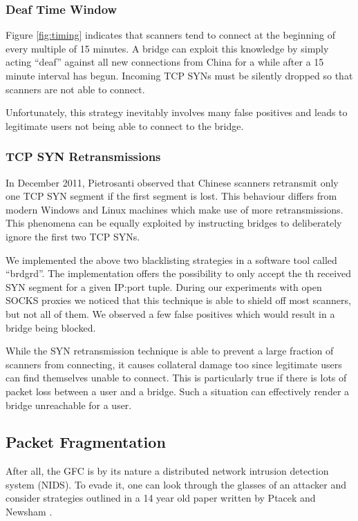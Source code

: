 \documentclass[runningheads,a4paper]{llncs}
\begin{document}
\subsubsection{Deaf Time Window}
Figure \ref{fig:timing} indicates that scanners tend to connect at the beginning of every multiple
of 15 minutes. A bridge can exploit this knowledge by simply acting ``deaf'' against all new
connections from China for a while after a 15 minute interval has begun. Incoming TCP SYNs must be
silently dropped so that scanners are not able to connect.

Unfortunately, this strategy inevitably involves many false positives and leads to legitimate users
not being able to connect to the bridge.

\subsubsection{TCP SYN Retransmissions}
In December 2011, Pietrosanti \cite{fabio} observed that Chinese scanners retransmit only one TCP
SYN segment if the first segment is lost. This behaviour differs from modern Windows and Linux
machines which make use of more retransmissions. This phenomena can be equally exploited by
instructing bridges to deliberately ignore the first two TCP SYNs.

We implemented the above two blacklisting strategies in a software tool called ``brdgrd''. The
implementation offers the possibility to only accept the th received SYN segment for a given
IP:port tuple. During our experiments with open SOCKS proxies we noticed that this technique is able
to shield off most scanners, but not all of them. We observed a few false positives which would
result in a bridge being blocked.

While the SYN retransmission technique is able to prevent a large fraction of scanners from
connecting, it causes collateral damage too since legitimate users can find themselves unable to
connect. This is particularly true if there is lots of packet loss between a user and a bridge.
Such a situation can effectively render a bridge unreachable for a user.

\subsection{Packet Fragmentation}
After all, the GFC is by its nature a distributed network intrusion detection system (NIDS). To
evade it, one can look through the glasses of an attacker and consider strategies outlined in a 14
year old paper written by Ptacek and Newsham \cite{Ptacek1998}.
\end{document}
